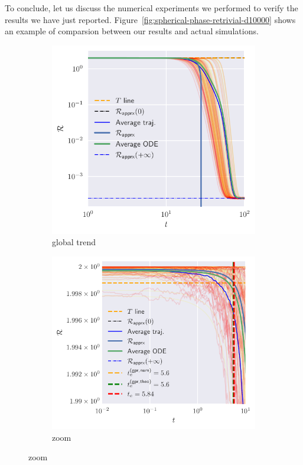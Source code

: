 To conclude, let us discuss the numerical experiments we performed to verify the results we have just reported.
Figure~\ref{fig:spherical-phase-retrivial-d10000} shows an example of comparsion between our results and actual simulations.
\begin{figure}
  \centering
  \begin{subfigure}{0.75\textwidth}
    \includegraphics[width=1.\textwidth]{figures/spherical/spr-example-d10000.pdf}
    \caption{global trend}
  \end{subfigure}
  \begin{subfigure}{0.77\textwidth}
    \includegraphics[width=1.\textwidth]{figures/spherical/spr-example-d10000-zoom.pdf}
    \caption{zoom}
  \end{subfigure}


\end{figure}
